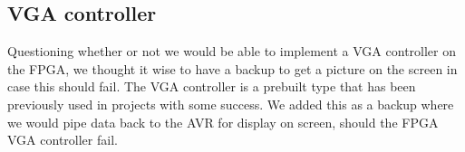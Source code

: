 \subsection{VGA controller}

Questioning whether or not we would be able to implement a \ac{VGA} controller
on the \ac{FPGA}, we thought it wise to have a backup to get a picture on the
screen in case this should fail. The \ac{VGA} controller is a prebuilt type that
has been previously used in projects with some success. We added this as a
backup where we would pipe data back to the AVR for display on screen, should
the \ac{FPGA} \ac{VGA} controller fail.


